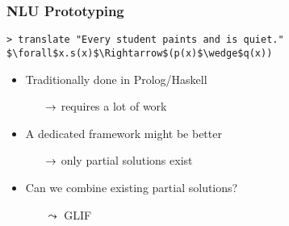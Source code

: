 



\begin{frame}[fragile]
    \frametitle{NLU Prototyping}
    \begin{lstlisting}[mathescape,keywords=translate,keywordstyle=\bf,
                       morestring={[d]"}, stringstyle=\it,showstringspaces=false]
> translate "Every student paints and is quiet."
$\forall$x.s(x)$\Rightarrow$(p(x)$\wedge$q(x))
    \end{lstlisting}
    \vspace{1em}
    \begin{itemize}
        \item Traditionally done in Prolog/Haskell
        \begin{itemize}
            \item[$\rightarrow$] requires a lot of work
        \end{itemize}
            \item A dedicated framework might be better
        \begin{itemize}
            \item[$\rightarrow$] only partial solutions exist
        \end{itemize}
        \item Can we combine existing partial solutions? %
        \begin{itemize}
            \item[$\leadsto$] GLIF
        \end{itemize}
    \end{itemize}
\end{frame}

